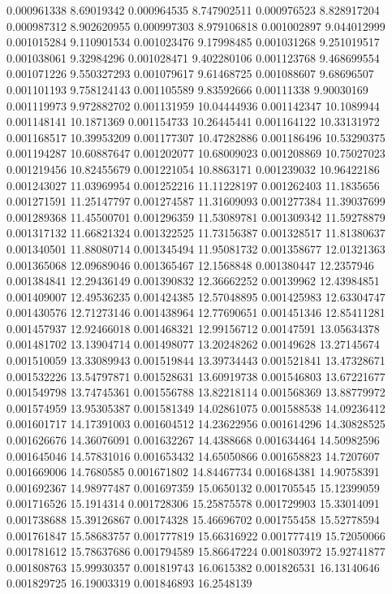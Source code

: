 0.000961338	8.69019342
0.000964535	8.747902511
0.000976523	8.828917204
0.000987312	8.902620955
0.000997303	8.979106818
0.001002897	9.044012999
0.001015284	9.110901534
0.001023476	9.17998485
0.001031268	9.251019517
0.001038061	9.32984296
0.001028471	9.402280106
0.001123768	9.468699554
0.001071226	9.550327293
0.001079617	9.61468725
0.001088607	9.68696507
0.001101193	9.758124143
0.001105589	9.83592666
0.00111338	9.90030169
0.001119973	9.972882702
0.001131959	10.04444936
0.001142347	10.1089944
0.001148141	10.1871369
0.001154733	10.26445441
0.001164122	10.33131972
0.001168517	10.39953209
0.001177307	10.47282886
0.001186496	10.53290375
0.001194287	10.60887647
0.001202077	10.68009023
0.001208869	10.75027023
0.001219456	10.82455679
0.001221054	10.8863171
0.001239032	10.96422186
0.001243027	11.03969954
0.001252216	11.11228197
0.001262403	11.1835656
0.001271591	11.25147797
0.001274587	11.31609093
0.001277384	11.39037699
0.001289368	11.45500701
0.001296359	11.53089781
0.001309342	11.59278879
0.001317132	11.66821324
0.001322525	11.73156387
0.001328517	11.81380637
0.001340501	11.88080714
0.001345494	11.95081732
0.001358677	12.01321363
0.001365068	12.09689046
0.001365467	12.1568848
0.001380447	12.2357946
0.001384841	12.29436149
0.001390832	12.36662252
0.00139962	12.43984851
0.001409007	12.49536235
0.001424385	12.57048895
0.001425983	12.63304747
0.001430576	12.71273146
0.001438964	12.77690651
0.001451346	12.85411281
0.001457937	12.92466018
0.001468321	12.99156712
0.00147591	13.05634378
0.001481702	13.13904714
0.001498077	13.20248262
0.00149628	13.27145674
0.001510059	13.33089943
0.001519844	13.39734443
0.001521841	13.47328671
0.001532226	13.54797871
0.001528631	13.60919738
0.001546803	13.67221677
0.001549798	13.74745361
0.001556788	13.82218114
0.001568369	13.88779972
0.001574959	13.95305387
0.001581349	14.02861075
0.001588538	14.09236412
0.001601717	14.17391003
0.001604512	14.23622956
0.001614296	14.30828525
0.001626676	14.36076091
0.001632267	14.4388668
0.001634464	14.50982596
0.001645046	14.57831016
0.001653432	14.65050866
0.001658823	14.7207607
0.001669006	14.7680585
0.001671802	14.84467734
0.001684381	14.90758391
0.001692367	14.98977487
0.001697359	15.0650132
0.001705545	15.12399059
0.001716526	15.1914314
0.001728306	15.25875578
0.001729903	15.33014091
0.001738688	15.39126867
0.00174328	15.46696702
0.001755458	15.52778594
0.001761847	15.58683757
0.001777819	15.66316922
0.001777419	15.72050066
0.001781612	15.78637686
0.001794589	15.86647224
0.001803972	15.92741877
0.001808763	15.99930357
0.001819743	16.0615382
0.001826531	16.13140646
0.001829725	16.19003319
0.001846893	16.2548139
